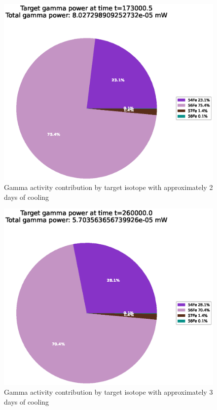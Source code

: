 \begin{figure}[!htb]
\centering
\includegraphics[width=0.8\linewidth]{chapters/activity_code/fe-activity-v2/target-energy/0233_173000.eps}
\caption{Gamma activity contribution by target isotope with approximately 2 days of cooling}
\label{fig:activity-v2-target-power-173000s}
\end{figure}

\begin{figure}[!htb]
\centering
\includegraphics[width=0.8\linewidth]{chapters/activity_code/fe-activity-v2/target-energy/0300_260000.eps}
\caption{Gamma activity contribution by target isotope with approximately 3 days of cooling}
\label{fig:activity-v2-target-power-260000s}
\end{figure}


